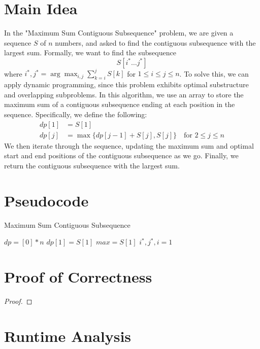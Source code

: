 \documentclass{article}
\begin{document}
\section{Main Idea}

In the "Maximum Sum Contiguous Subsequence" problem, we are given a sequence $S$ of $n$ numbers, and asked to find the contiguous subsequence with the largest sum.
Formally, we want to find the subsequence $$S[i^* \ldots j^*]$$ where $i^*, j^* = \arg\max_{i,j} \sum_{k=i}^{j} S[k]$ for $1 \leq i \leq j \leq n$.
To solve this, we can apply dynamic programming, since this problem exhibits optimal substructure and overlapping subproblems.
In this algorithm, we use an array to store the maximum sum of a contiguous subsequence ending at each position in the sequence.
Specifically, we define the following:
\begin{align*}
    dp[1] &= S[1] \\
    dp[j] &= \max\{dp[j-1] + S[j], S[j]\} \quad \text{for } 2 \leq j \leq n
\end{align*}
We then iterate through the sequence, updating the maximum sum and optimal start and end positions of the contiguous subsequence as we go.
Finally, we return the contiguous subsequence with the largest sum.

\section{Pseudocode}

\begin{algorithm}[H]
\caption{Maximum Sum Contiguous Subsequence}
$dp = [0] * n$\; 
$dp[1] = S[1]$\;
$max = S[1]$\;
$i^*, j^*, i = 1$\;
\;
\end{algorithm}

\section{Proof of Correctness}

\begin{proof}

\end{proof}

\section{Runtime Analysis}
\end{document}
